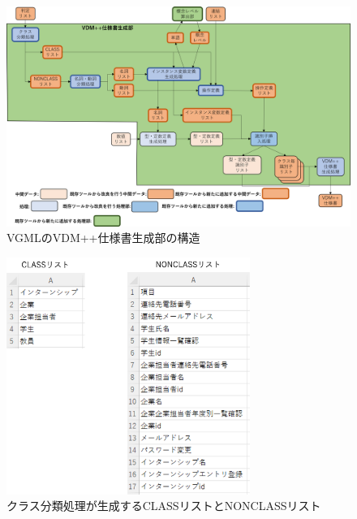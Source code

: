\begin{figure}[t]
    \begin{center}
        \includegraphics[width=1.0\columnwidth]{image/vgml_generator.png}
        \caption{VGMLのVDM++仕様書生成部の構造}
        \label{fig:vgml_generator}
    \end{center}
\end{figure}

\begin{figure}[t]
    \begin{center}
        \includegraphics[width=300]{image/class_nonclass_list.png}
        \caption{クラス分類処理が生成するCLASSリストとNONCLASSリスト}
        \label{fig:class_nonclass_list}
    \end{center}
\end{figure}

